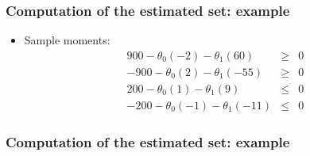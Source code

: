 \documentclass[notes=show]{beamer}
\begin{document}

\begin{frame}
\frametitle{Computation of the estimated set: example}

\begin{itemize}
\item Sample moments:  
\begin{eqnarray*}
900-\theta _{0}(-2)-\theta _{1}(60) &\geq &0 \\
-900-\theta _{0}(2)-\theta _{1}(-55) &\geq &0 \\
200-\theta _{0}(1)-\theta _{1}(9) &\leq &0 \\
-200-\theta _{0}(-1)-\theta _{1}(-11) &\leq &0
\end{eqnarray*}
\end{itemize}
\end{frame}


\begin{frame}
\frametitle{Computation of the estimated set: example}

\begin{figure}[h!]
\begin{center}
 
\end{center}
\end{figure}
\end{frame}
\end{document}
